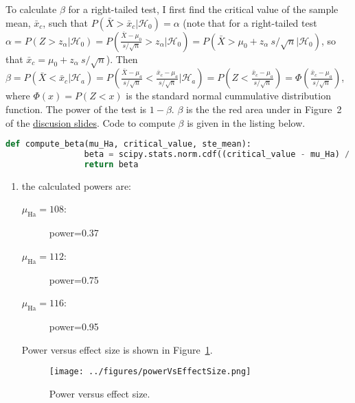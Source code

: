 \documentclass[12pt]{article}
\begin{document}
\begin{enumerate}
        To calculate $\beta$ for a right-tailed test, I first find the critical value of the sample
        mean, $\bar{x}_c$, such that
        $P(\bar{X}>\bar{x}_c|\mathcal{H}_0)=\alpha$ (note that for a
        right-tailed test
        $\alpha=P(Z>z_\alpha|\mathcal{H}_0)=P(\frac{\bar{X}-\mu_0}{s/\sqrt{n}}>z_\alpha|\mathcal{H}_0)=P(\bar{X}>\mu_0+z_\alpha\ s/\sqrt{n}|\mathcal{H}_0)$, so that $\bar{x}_c=\mu_0+z_\alpha\ s/\sqrt{n}$).
        Then
        $\beta=P(\bar{X}<\bar{x}_c|\mathcal{H}_a)=P(\frac{\bar{X}-\mu_a}{s/\sqrt{n}}<\frac{\bar{x}_c-\mu_a}{s/\sqrt{n}}|\mathcal{H}_a)=P(Z<\frac{\bar{x}_c-\mu_a}{s/\sqrt{n}})=\Phi(\frac{\bar{x}_c-\mu_a}{s/\sqrt{n}})$,
        where $\Phi(x)=P(Z<x)$ is the standard normal cummulative distribution
        function. The power of the test
        is $1-\beta$. $\beta$ is the the red area under in Figure~2 of the
        \href{https://github.com/joacorapela/neuroinformatics24/blob/master/practicals/01_tTestAndRandomizationTests/introAndHipothesisTests.pdf}{discusion
        slides}. Code to compute $\beta$ is given in the listing below.

        \begin{lstlisting}[language=Python]
            def compute_beta(mu_Ha, critical_value, ste_mean):
                beta = scipy.stats.norm.cdf((critical_value - mu_Ha) / ste_mean)
                return beta
        \end{lstlisting}

        \begin{enumerate}
            \item the calculated powers are:
                \begin{description}
                    \item[$\mu_\text{Ha}=108$:] power=0.37
                    \item[$\mu_\text{Ha}=112$:] power=0.75
                    \item[$\mu_\text{Ha}=116$:] power=0.95
                \end{description}

                Power versus effect size is shown in
                Figure~\ref{fig:powerVsEffectSize}.

                \begin{figure}
                    \begin{center}
                        \texttt{[image: ../figures/powerVsEffectSize.png]}
                    \end{center}
                    \caption{Power versus effect size.}
                    \label{fig:powerVsEffectSize}
                \end{figure}


\end{enumerate}
\end{enumerate}
\end{document}
